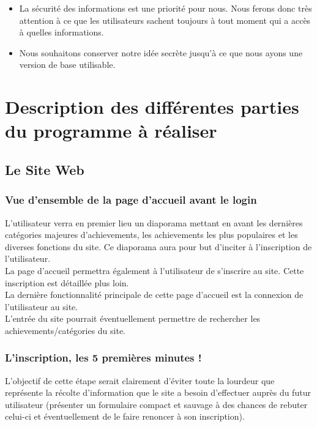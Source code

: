 \documentclass{life-fr}
\begin{document}
\begin{itemize}
  \item La sécurité des informations est une priorité pour nous. Nous ferons donc très attention à ce que les utilisateurs sachent toujours à tout moment qui a accès à quelles informations.
  \item Nous souhaitons conserver notre idée secrète jusqu’à ce que nous ayons une version de base utilisable.
\end{itemize}

\chapter{Description des différentes parties du programme à réaliser}

\section{Le Site Web}

\subsection{Vue d'ensemble de la page d'accueil avant le login}

L'utilisateur verra en premier lieu un diaporama mettant en avant les dernières catégories majeures d'achievements, les achievements les plus populaires et les diverses fonctions du site. Ce diaporama aura pour but d'inciter à l'inscription de l'utilisateur.\\

La page d'accueil permettra également à l'utilisateur de s'inscrire au site. Cette inscription est détaillée plus loin.\\

La dernière fonctionnalité principale de cette page d'accueil est la connexion de l'utilisateur au site.\\

L'entrée du site pourrait éventuellement permettre de rechercher les achievements/catégories du site.

\subsection{L'inscription, les 5 premières minutes !}

L'objectif de cette étape serait clairement d'éviter toute la lourdeur que représente la récolte d'information que le site a besoin d'effectuer auprès du futur utilisateur (présenter un formulaire compact et sauvage à des chances de rebuter celui-ci et éventuellement de le faire renoncer à son inscription).\\
\end{document}
